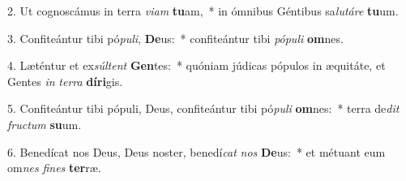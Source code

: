 2. Ut cognoscámus in terra \textit{vi}\textit{am} \textbf{tu}am,~*  in ómnibus Géntibus sa\textit{lu}\textit{tá}\textit{re} \textbf{tu}um.\

3. Confiteántur tibi pó\textit{pu}\textit{li}, \textbf{De}us:~*  confiteántur tibi \textit{pó}\textit{pu}\textit{li} \textbf{om}nes.\

4. Læténtur et ex\textit{súl}\textit{tent} \textbf{Gen}tes:~*  quóniam júdicas pópulos in æquitáte, et Gentes \textit{in} \textit{ter}\textit{ra} \textbf{dí}\textbf{ri}gis.\

5. Confiteántur tibi pópuli, Deus, confiteántur tibi pó\textit{pu}\textit{li} \textbf{om}nes:~*  terra de\textit{dit} \textit{fruc}\textit{tum} \textbf{su}um.\

6. Benedícat nos Deus, Deus noster, benedí\textit{cat} \textit{nos} \textbf{De}us:~*  et métuant eum om\textit{nes} \textit{fi}\textit{nes} \textbf{ter}ræ.\

